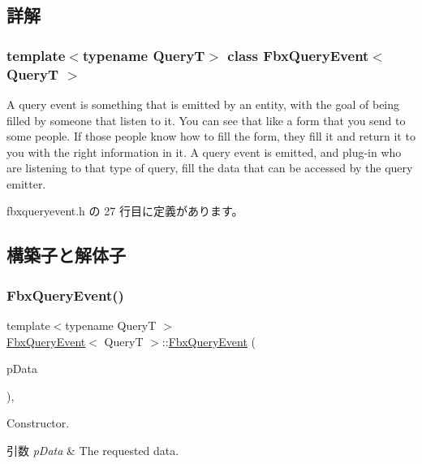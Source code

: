\subsection{詳解}
\subsubsection*{template$<$typename QueryT$>$\newline
class Fbx\+Query\+Event$<$ Query\+T $>$}

A query event is something that is emitted by an entity, with the goal of being filled by someone that listen to it. You can see that like a form that you send to some people. If those people know how to fill the form, they fill it and return it to you with the right information in it. A query event is emitted, and plug-\/in who are listening to that type of query, fill the data that can be accessed by the query emitter. 

 fbxqueryevent.\+h の 27 行目に定義があります。



\subsection{構築子と解体子}
\mbox{\label{class_fbx_query_event_ac0f4e691d9190901d1b55cea64653055}} 
\subsubsection{\texorpdfstring{Fbx\+Query\+Event()}{FbxQueryEvent()}}
{\footnotesize\ttfamily template$<$typename QueryT $>$ \\
\hyperlink{class_fbx_query_event}{Fbx\+Query\+Event}$<$ QueryT $>$\+::\hyperlink{class_fbx_query_event}{Fbx\+Query\+Event} (\begin{DoxyParamCaption}\item[{QueryT $\ast$}]{p\+Data }\end{DoxyParamCaption})\hspace{0.3cm}{\ttfamily [inline]}, {\ttfamily [explicit]}}

Constructor. 
\begin{DoxyParams}{引数}
{\em p\+Data} & The requested data. \\
\hline
\end{DoxyParams}


